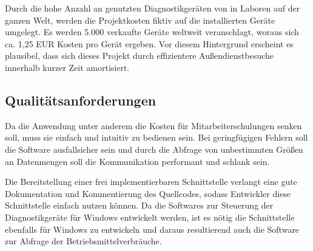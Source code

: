 Durch die hohe Anzahl an genutzten Diagnostikgeräten von {\betriebNameKzf} in Laboren auf der ganzen Welt, werden die Projektkosten fiktiv auf die installierten Geräte umgelegt. Es werden 5.000 verkaufte Geräte weltweit veranschlagt, woraus sich ca. 1,25 EUR Kosten pro Gerät ergeben. Vor diesem Hintergrund erscheint es plausibel, dass sich dieses Projekt durch effizientere Außendienstbesuche innerhalb kurzer Zeit amortisiert.

\subsection{Qualitätsanforderungen}
\label{sec:Qualitätsanforderungen}
Da die Anwendung unter anderem die Kosten für Mitarbeiterschulungen senken soll, muss sie einfach und intuitiv zu bedienen sein. Bei geringfügigen Fehlern soll die Software ausfallsicher sein und durch die Abfrage von unbestimmten Größen an Datenmengen soll die Kommunikation performant und schlank sein.

Die Bereitstellung einer frei implementierbaren Schnittstelle verlangt eine gute Dokumentation und Kommentierung des Quellcodes, sodass Entwickler diese Schnittstelle einfach nutzen können. Da die Softwares zur Steuerung der Diagnostikgeräte für Windows entwickelt werden, ist es nötig die Schnittstelle ebenfalls für Windows zu entwickeln und daraus resultierend auch die Software zur Abfrage der Betriebsmittelverbräuche.